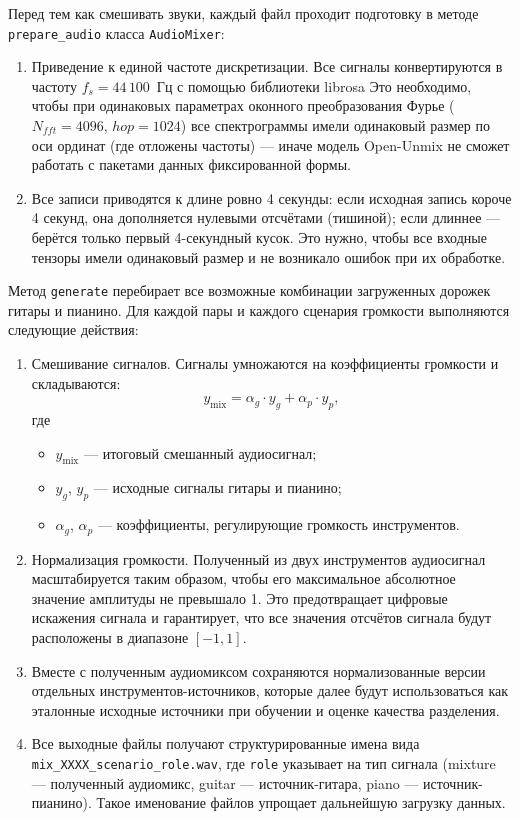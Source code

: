 \documentclass[14pt]{extarticle}
\begin{document}
Перед тем как смешивать звуки, каждый файл проходит подготовку в методе \texttt{prepare\_audio} класса \texttt{AudioMixer}:
\begin{enumerate}[label=\arabic*)]
	\item Приведение к единой частоте дискретизации. 
	Все сигналы конвертируются в частоту $f_s = 44\,100$~Гц с помощью библиотеки librosa
	Это необходимо, чтобы при одинаковых параметрах оконного преобразования Фурье ($N_{fft}=4096$, $hop=1024$) 
	все спектрограммы имели одинаковый размер по оси ординат (где отложены частоты) --- иначе модель Open-Unmix не сможет 
	работать с пакетами данных фиксированной формы.
	\item Все записи приводятся к длине ровно 4 секунды: если исходная запись короче 4 секунд, она дополняется нулевыми отсчётами (тишиной);
	если длиннее — берётся только первый 4-секундный кусок. Это нужно, чтобы все входные тензоры имели одинаковый размер и не возникало ошибок при их обработке.
\end{enumerate}

Метод \texttt{generate} перебирает все возможные комбинации загруженных дорожек гитары и пианино. 
Для каждой пары и каждого сценария громкости выполняются следующие действия:
\begin{enumerate}[label=\arabic*)]
	\item Смешивание сигналов. Сигналы умножаются на коэффициенты громкости и складываются:
		\begin{equation*}
			y_{\text{mix}} = \alpha_g \cdot y_g + \alpha_p \cdot y_p,
			\label{eq:audio_mixing}
		\end{equation*}
		где
			\begin{itemize}[label=$\bullet$, wide]
				\item $y_{\text{mix}}$ --- итоговый смешанный аудиосигнал;
				\item $y_g$, $y_p$ --- исходные сигналы гитары и пианино;
				\item $\alpha_g$, $\alpha_p$ --- коэффициенты, регулирующие громкость инструментов.
			\end{itemize}
	\item Нормализация громкости. Полученный из двух инструментов аудиосигнал масштабируется таким образом, чтобы его
	максимальное абсолютное значение амплитуды не превышало 1. Это предотвращает цифровые искажения сигнала и 
	гарантирует, что все значения отсчётов сигнала будут расположены в диапазоне $[−1,1]$.
	\item Вместе с полученным аудиомиксом сохраняются нормализованные версии отдельных инструментов-источников,
	которые далее будут использоваться как эталонные исходные источники при обучении и оценке качества разделения.
	\item Все выходные файлы получают структурированные имена вида \texttt{mix\_XXXX\_scenario\_role.wav}, 
	где \texttt{role} указывает на тип сигнала (mixture --- полученный аудиомикс, guitar --- источник-гитара, 
	piano --- источник-пианино). Такое именование файлов упрощает дальнейшую загрузку данных.
\end{enumerate}
\end{document}
